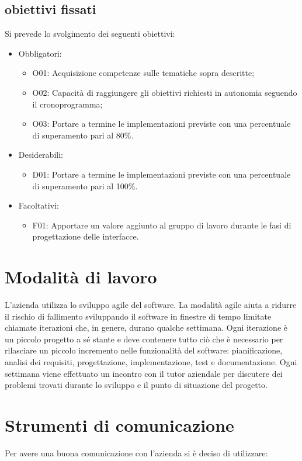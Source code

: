 \subsection{obiettivi fissati}
Si prevede lo svolgimento dei seguenti obiettivi:
\begin{itemize}
    \item Obbligatori:
    \begin{itemize}
        \item O01: Acquisizione competenze sulle tematiche sopra descritte;
        \item O02: Capacità di raggiungere gli obiettivi richiesti in autonomia seguendo il cronoprogramma;
        \item O03: Portare a termine le implementazioni previste con una percentuale di superamento pari al 80\%.        
    \end{itemize}
    \item Desiderabili:
     \begin{itemize}
        \item D01: Portare a termine le implementazioni previste con una percentuale di superamento pari al 100\%.
     \end{itemize}
     \item Facoltativi:
     \begin{itemize}
        \item F01: Apportare un valore aggiunto al gruppo di lavoro durante le fasi di progettazione delle interfacce.
     \end{itemize}
\end{itemize}


\section{Modalità di lavoro}
L'azienda utilizza lo sviluppo agile del software. La modalità agile aiuta a ridurre il rischio di fallimento sviluppando il software in finestre di tempo limitate chiamate iterazioni che, in genere, durano qualche settimana. Ogni iterazione è un piccolo progetto a sé stante e deve contenere tutto ciò che è necessario per rilasciare un piccolo incremento nelle funzionalità del software: pianificazione, analisi dei requisiti, progettazione, implementazione, test e documentazione. Ogni settimana viene effettuato un incontro con il tutor aziendale per discutere dei problemi trovati durante lo sviluppo e il punto di situazione del progetto.
\section{Strumenti di comunicazione}
Per avere una buona comunicazione con l'azienda si è deciso di utilizzare:
